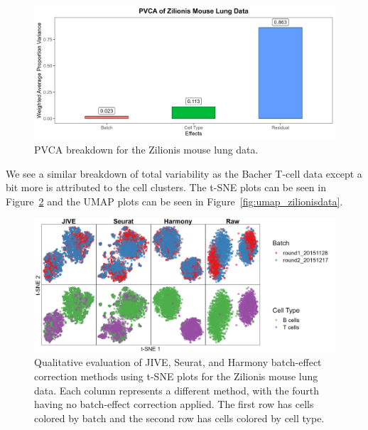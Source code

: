 \documentclass[unnumsec,webpdf,contemporary,large]{oup-authoring-template}%
\theoremstyle{thmstyleone}%
\theoremstyle{thmstyletwo}%
\theoremstyle{thmstylethree}%
\begin{document}
\begin{figure}[ht]
    \centering 
    \includegraphics[width=1\columnwidth]{pvca_zilionisdata} 
    \caption[PVCA Breakdown for the Zilionis Mouse Lung Data]{PVCA breakdown for the Zilionis mouse lung data.}
    \label{fig:pvca_zilionisdata} 
\end{figure}

We see a similar breakdown of total variability as the Bacher T-cell data except a bit more is attributed to the cell clusters. The t-SNE plots can be seen in Figure~\ref{fig:tsne_zilionisdata} and the UMAP plots can be seen in Figure~\ref{fig:umap_zilionisdata}.

\begin{figure}[ht]
    \centering 
    \includegraphics[width=1\columnwidth]{tsne_zilionisdata} 
    \caption[t-SNE Plots for the Zilionis Mouse Lung Data]{Qualitative evaluation of JIVE, Seurat, and Harmony batch-effect correction methods using t-SNE plots for the Zilionis mouse lung data. Each column represents a different method, with the fourth having no batch-effect correction applied. The first row has cells colored by batch and the second row has cells colored by cell type.}
    \label{fig:tsne_zilionisdata}
\end{figure}
\end{document}
